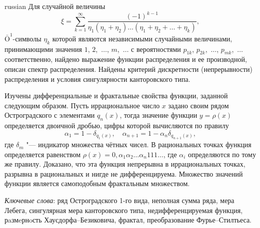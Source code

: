 \documentclass{vakaref}
\theoremstyle{plain}
\theoremstyle{definition}
\theoremstyle{remark}
\newcommand{\bOsign}[1]{\bar{\mathrm{O}}^{#1}}
\begin{document}
\begin{otherlanguage*}{russian}
Для случайной величины
\[
\xi = \sum_{k=1}^\infty
\frac{(-1)^{k-1}}{\eta_1(\eta_1+\eta_2)\dots(\eta_1+\eta_2+\dots+\eta_k)},
\]
$\bOsign1$-символы $\eta_k$ которой являются независимыми
случайными величинами, принимающими значения $1$, $2$,~$\dots$,
$m$,~$\dots$ с вероятностями $p_{1k}$, $p_{2k}$,~$\dots$,
$p_{mk}$,~$\dots$ соответственно, найдено выражение функции
распределения и ее производной, описан спектр распределения.
Найдены критерий дискретности (непрерывности) распределения и
условия сингулярности канторовского типа.

Изучены дифференциальные и фрактальные свойства функции, заданной
следующим образом. Пусть иррациональное число $x$ задано своим
рядом Остроградского с элементами $q_n(x)$, тогда значение функции
\(y=\rho(x)\) определяется двоичной дробью, цифры которой
вычисляются по правилу
\[
\alpha_1=1-\delta_{q_1(x)}, \quad
\alpha_{n+1}=1-\alpha_n\delta_{q_{n+1}(x)},
\]
где $\delta_m$ "--- индикатор множества чётных чисел. В
рациональных точках функция определяется равенством
$\rho(x)=0{,}\alpha_1\alpha_2\dots \alpha_n111\dots$, где
$\alpha_i$ определяются по тому же правилу. Доказано, что эта
функция непрерывна в иррациональных точках, разрывна в
рациональных и нигде не дифференцируема. Множество значений
функции является самоподобным фрактальным множеством.

\smallskip

\emph{Ключевые слова}: ряд Остроградского 1-го вида, неполная
сумма ряда, мера Лебега, сингулярная мера канторовского типа,
недифференцируемая функция, рaзмeрнoсть Хаусдорфа--Безиковича,
фрактал, преобразование Фурье--Стилтьеса.

\end{otherlanguage*}

\bigskip
\end{document}
